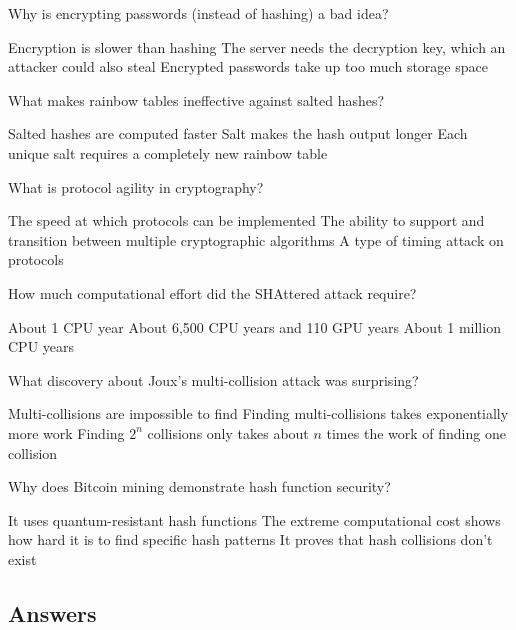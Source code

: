 \documentclass[10pt,a4paper,american]{exam}
\begin{document}
\begin{questions}
	\question Why is encrypting passwords (instead of hashing) a bad idea?
	\begin{randomizechoices}
		\choice Encryption is slower than hashing
		\CorrectChoice The server needs the decryption key, which an attacker could also steal
		\choice Encrypted passwords take up too much storage space
	\end{randomizechoices}

	\question What makes rainbow tables ineffective against salted hashes?
	\begin{randomizechoices}
		\choice Salted hashes are computed faster
		\choice Salt makes the hash output longer
		\CorrectChoice Each unique salt requires a completely new rainbow table
	\end{randomizechoices}

	\question What is protocol agility in cryptography?
	\begin{randomizechoices}
		\choice The speed at which protocols can be implemented
		\CorrectChoice The ability to support and transition between multiple cryptographic algorithms
		\choice A type of timing attack on protocols
	\end{randomizechoices}

	\question How much computational effort did the SHAttered attack require?
	\begin{randomizechoices}
		\choice About 1 CPU year
		\CorrectChoice About 6,500 CPU years and 110 GPU years
		\choice About 1 million CPU years
	\end{randomizechoices}

	\question What discovery about Joux's multi-collision attack was surprising?
	\begin{randomizechoices}
		\choice Multi-collisions are impossible to find
		\choice Finding multi-collisions takes exponentially more work
		\CorrectChoice Finding $2^n$ collisions only takes about $n$ times the work of finding one collision
	\end{randomizechoices}

	\question Why does Bitcoin mining demonstrate hash function security?
	\begin{randomizechoices}
		\choice It uses quantum-resistant hash functions
		\CorrectChoice The extreme computational cost shows how hard it is to find specific hash patterns
		\choice It proves that hash collisions don't exist
	\end{randomizechoices}

\end{questions}

\clearpage

\subsection*{Answers}
\printkeytable
\end{document}
